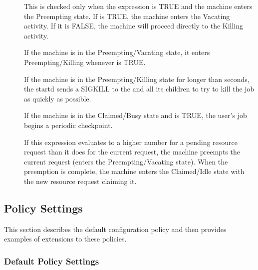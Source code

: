 \begin{description}
\item[] This is checked only when the
   expression is TRUE and the machine enters the
  Preempting state.
  If  is TRUE, the machine enters the Vacating
  activity.  
  If it is FALSE, the machine will proceed directly to the Killing
  activity.  
  
\item[] If the machine is in the Preempting/Vacating state, it
  enters Preempting/Killing whenever  is TRUE. 
  
\item[] If the machine is in the
  Preempting/Killing state for longer than 
  seconds, the startd sends a SIGKILL to the 
  and all its children to try to kill the job as quickly as possible.
  
\item[] If the machine is in the
  Claimed/Busy state and  is TRUE, the
  user's job begins a periodic checkpoint.
  
\item[] If this expression evaluates to a higher number for
  a pending resource request than it does for the current request, the
  machine preempts the current request (enters the
  Preempting/Vacating state).  When the preemption is complete, the
  machine enters the Claimed/Idle state with the new resource
  request claiming it.

\end{description}

\subsection{\label{sec:Policy-Settings}Policy Settings}

This section describes the default configuration
policy and then provides examples of extensions to these
policies.

\subsubsection{\label{sec:Default-Policy}Default Policy Settings}

